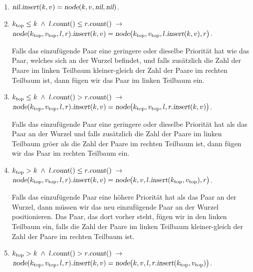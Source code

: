 \begin{enumerate}
\item $\textsl{nil}.\textsl{insert}(k,v) = \textsl{node}(k,v,\textsl{nil}, \textsl{nil})$.
\item $k_{\mathrm{top}} \leq k \;\wedge\; l.\textsl{count}() \leq r.\textsl{count}() \;\rightarrow $   \\[0.1cm]
      \hspace*{1.3cm} 
      $\textsl{node}(k_{\mathrm{top}},v_\mathrm{top},l,r).\textsl{insert}(k,v) =
                 \textsl{node}\bigl(k_\mathrm{top},v_\mathrm{top},l.\textsl{insert}(k,v), r\bigr)$.

      Falls das einzuf\"ugende Paar eine geringere oder dieselbe Priorit\"at hat wie das
      Paar, welches sich an der Wurzel befindet, und falls zus\"atzlich die Zahl der Paare im linken Teilbaum
      kleiner-gleich der Zahl der Paare im rechten Teilbaum ist, dann f\"ugen wir das
      Paar im linken Teilbaum ein.
\item $k_{\mathrm{top}} \leq k \;\wedge\; l.\textsl{count}() > r.\textsl{count}() \;\rightarrow $   \\[0.1cm]
      \hspace*{1.3cm} 
      $\textsl{node}(k_{\mathrm{top}},v_\mathrm{top},l,r).\textsl{insert}(k,v) =
                 \textsl{node}\bigl(k_\mathrm{top},v_\mathrm{top},l,r.\textsl{insert}(k,v)\bigr)$.

      Falls das einzuf\"ugende Paar eine geringere oder dieselbe Priorit\"at hat als das
      Paar an der Wurzel und falls zus\"atzlich die Zahl der Paare im linken Teilbaum
      gr\"o\3er als die Zahl der Paare im rechten Teilbaum ist, dann f\"ugen wir das
      Paar im rechten Teilbaum ein.
\item $k_{\mathrm{top}} > k \;\wedge\; l.\textsl{count}() \leq r.\textsl{count}() \;\rightarrow $ \\[0.1cm]
      \hspace*{1.3cm} 
      $\textsl{node}(k_{\mathrm{top}},v_\mathrm{top},l,r).\textsl{insert}(k,v) =
                 \textsl{node}\bigl(k,v,l.\textsl{insert}(k_\mathrm{top},v_\mathrm{top}), r\bigr)$.

      Falls das einzuf\"ugende Paar eine h\"ohere Priorit\"at hat als das Paar an
      der Wurzel, dann m\"ussen wir das neu einzuf\"ugende Paar an der Wurzel
      positionieren.  Das Paar, das dort vorher steht, f\"ugen wir in den linken
      Teilbaum ein, falls  die Zahl der Paare im linken Teilbaum
      kleiner-gleich der Zahl der Paare im rechten Teilbaum ist.
\item $k_{\mathrm{top}} > k \;\wedge\; l.\textsl{count}() > r.\textsl{count}() \;\rightarrow $ \\[0.1cm] 
      \hspace*{1.3cm} 
      $\textsl{node}(k_{\mathrm{top}},v_\mathrm{top},l,r).\textsl{insert}(k,v) =
                 \textsl{node}\bigl(k,v,l,r.\textsl{insert}(k_\mathrm{top},v_\mathrm{top})\bigr)$.


\end{enumerate}
